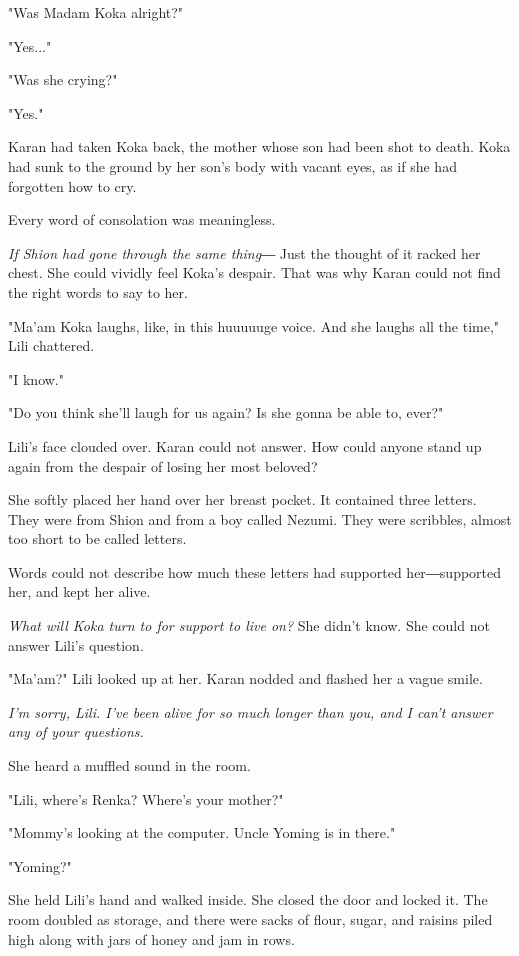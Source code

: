 "Was Madam Koka alright?"

"Yes..."

"Was she crying?"

"Yes."

Karan had taken Koka back, the mother whose son had been shot to death.
Koka had sunk to the ground by her son's body with vacant eyes, as if
she had forgotten how to cry.

Every word of consolation was meaningless.

\emph{If Shion had gone through the same thing―} Just the thought of it racked
her chest. She could vividly feel Koka's despair. That was why Karan
could not find the right words to say to her.

"Ma'am Koka laughs, like, in this huuuuuge voice. And she laughs all the
time," Lili chattered.

"I know."

"Do you think she'll laugh for us again? Is she gonna be able to, ever?"

Lili's face clouded over. Karan could not answer. How could anyone stand
up again from the despair of losing her most beloved?

She softly placed her hand over her breast pocket. It contained three
letters. They were from Shion and from a boy called Nezumi. They were
scribbles, almost too short to be called letters.




Words could not describe how much these letters had supported
her―supported her, and kept her alive.

\emph{What will Koka turn to for support to live on?} She didn't know. She
could not answer Lili's question.

"Ma'am?" Lili looked up at her. Karan nodded and flashed her a vague
smile.

\emph{I'm sorry, Lili. I've been alive for so much longer than you, and I
can't answer any of your questions.}

She heard a muffled sound in the room.

"Lili, where's Renka? Where's your mother?"

"Mommy's looking at the computer. Uncle Yoming is in there."

"Yoming?"

She held Lili's hand and walked inside. She closed the door and locked
it. The room doubled as storage, and there were sacks of flour, sugar,
and raisins piled high along with jars of honey and jam in rows.

